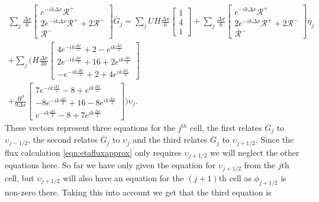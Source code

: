 \begin{multline*}
\sum_j \frac{\Delta x}{6}\begin{bmatrix} e^{-ik\Delta x} \mathcal{R}^+ \\2 e^{-ik\Delta x} \mathcal{R}^+ +2 \mathcal{R}^-\\ \mathcal{R}^- \end{bmatrix} \overline{G}_{j} = \sum_jUH \frac{\Delta x}{6}\begin{bmatrix} 1 \\4 \\ 1 \end{bmatrix} +  \sum_j \frac{\Delta x}{6}\begin{bmatrix} e^{-ik\Delta x} \mathcal{R}^+ \\2 e^{-ik\Delta x} \mathcal{R}^+ +2 \mathcal{R}^-\\ \mathcal{R}^- \end{bmatrix} \overline{\eta}_{j} \\ + \sum_j \Bigg(H\frac{\Delta x}{30}\begin{bmatrix} 4e^{-ik\frac{\Delta x}{2}} +  2 - e^{ik\frac{\Delta x}{2}}\\2e^{-ik\frac{\Delta x}{2}}  + 16  +2 e^{ik\frac{\Delta x}{2}}  \\ -e^{-ik\frac{\Delta x}{2}} +  2 + 4e^{ik\frac{\Delta x}{2}} \end{bmatrix} \\+ \frac{H^3 }{9\Delta x}\begin{bmatrix} 7e^{-ik\frac{\Delta x}{2}} -8 + e^{ik\frac{\Delta x}{2}} \\ -8e^{-ik\frac{\Delta x}{2}} +  16  -8e^{ik\frac{\Delta x}{2}} \\ e^{-ik\frac{\Delta x}{2}} -8 + 7e^{ik\frac{\Delta x}{2}} \end{bmatrix}  \Bigg) \upsilon_j.
\end{multline*}
These vectors represent three equations for the $j^{th}$ cell, the first relates $\overline{G}_j$ to $\upsilon_{j-1/2}$, the second relates $\overline{G}_j$ to $\upsilon_{j}$ and the third relates $\overline{G}_j$ to $\upsilon_{j+1/2}$. Since the flux calculation \eqref{eqn:etafluxapprox} only requires $\upsilon_{j+1/2}$ we will neglect the other equations here. So far we have only given the equation for $\upsilon_{j+1/2}$ from the $j$th cell, but $\upsilon_{j+1/2}$ will also have an equation for the $(j+1)$th cell as $\phi_{j+1/2}$ is non-zero there. Taking this into account we get that the  third equation is
